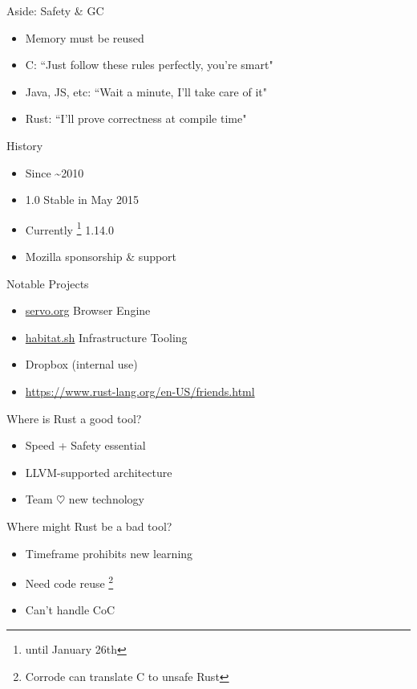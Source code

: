 \documentclass[50pt]{beamer}
\begin{document}
\begin{frame}
    Aside: Safety \& GC
    \begin{itemize}
        \item Memory must be reused
        \item C: ``Just follow these rules perfectly, you're smart"
        \item Java, JS, etc: ``Wait a minute, I'll take care of it"
        \item Rust: ``I'll prove correctness at compile time"
    \end{itemize}
\end{frame}

\begin{frame}
    History
    \begin{itemize}
        \item Since \textasciitilde 2010
        \item 1.0 Stable in May 2015
        \item Currently \footnote{until January 26th} 1.14.0
        \item Mozilla sponsorship \& support
    \end{itemize}
\end{frame}

\begin{frame}
    Notable Projects
    \begin{itemize}
        \item \url{servo.org} Browser Engine
        \item \url{habitat.sh} Infrastructure Tooling
        \item Dropbox (internal use)
        \item \url{https://www.rust-lang.org/en-US/friends.html}
    \end{itemize}
\end{frame}

\begin{frame}
    Where is Rust a good tool?
    \begin{itemize}
        \item Speed + Safety essential
        \item LLVM-supported architecture
        \item Team $\heartsuit$ new technology
    \end{itemize}
\end{frame}

\begin{frame}
    Where might Rust be a bad tool?
    \begin{itemize}
        \item Timeframe prohibits new learning
        \item Need code reuse \footnote{Corrode can translate C to unsafe Rust}
        \item Can't handle CoC
    \end{itemize}
\end{frame}
\end{document}
